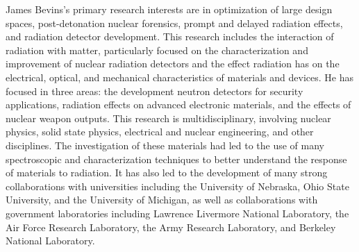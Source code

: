 James Bevins's primary research interests are in optimization of large design spaces, post-detonation nuclear forensics, prompt and delayed radiation effects, and radiation detector development. This research includes the interaction of radiation with matter, particularly focused on the characterization and improvement of nuclear radiation detectors and the effect radiation has on the electrical, optical, and mechanical characteristics of materials and devices. He has focused in three areas: the development neutron detectors for security applications, radiation effects on advanced electronic materials, and the effects of nuclear weapon outputs.
This research is multidisciplinary, involving nuclear physics, solid state physics, electrical and nuclear engineering, and other disciplines. The investigation of these materials had led to the use of many spectroscopic and characterization techniques to better understand the response of materials to radiation. It has also led to the development of many strong collaborations with universities including the University of Nebraska, Ohio State University, and the University of Michigan, as well as collaborations with government laboratories including Lawrence Livermore National Laboratory, the Air Force Research Laboratory, the Army Research Laboratory, and Berkeley National Laboratory. 
